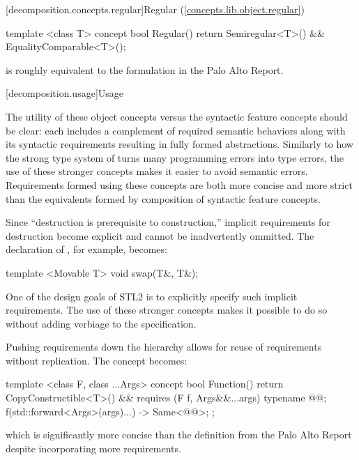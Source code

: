 [decomposition.concepts.regular]{Regular (\ref{concepts.lib.object.regular})}
\begin{codeblock}
template <class T>
concept bool Regular() {
  return Semiregular<T>() &&
    EqualityComparable<T>();
}
\end{codeblock}
 is roughly equivalent to the formulation in the Palo Alto Report.

[decomposition.usage]{Usage}

\pnum
The utility of these object concepts versus the syntactic feature concepts should be clear: each
includes a complement of required semantic behaviors along with its syntactic requirements resulting
in fully formed abstractions. Similarly to how the strong type system of \Cpp turns many programming
errors into type errors, the use of these stronger concepts makes it easier to avoid semantic errors.
Requirements formed using these concepts are both more concise and more strict than the equivalents
formed by composition of syntactic feature concepts.

\pnum
Since ``destruction is prerequisite to construction,'' implicit requirements for destruction become
explicit and cannot be inadvertently ommitted. The declaration of , for example, becomes:
\begin{codeblock}
template <Movable T>
void swap(T&, T&);
\end{codeblock}
One of the design goals of STL2 is to explicitly specify such implicit requirements. The use of these
stronger concepts makes it possible to do so without adding verbiage to the specification.

\pnum
Pushing requirements down the hierarchy allows for reuse of requirements without replication. The
 concept becomes:
\begin{codeblock}
template <class F, class ...Args>
concept bool Function() {
  return CopyConstructible<T>() &&
    requires (F f, Args&&...args) {
      typename @@;
      { f(std::forward<Args>(args)...) } ->
        Same<@@>;
    };
}
\end{codeblock}
which is significantly more concise than the definition from the Palo Alto Report despite
incorporating more requirements.
